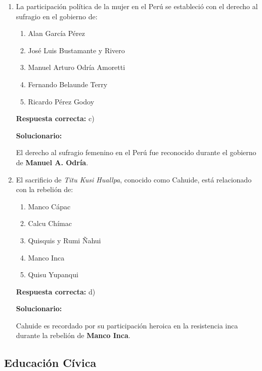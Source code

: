 \begin{enumerate}[resume]
	
	
	\item La participación política de la mujer en el Perú se estableció con el derecho al sufragio en el gobierno de:
	\begin{enumerate}[label=\alph*)]
		\item Alan García Pérez
		\item José Luis Bustamante y Rivero
		\item Manuel Arturo Odría Amoretti
		\item Fernando Belaunde Terry
		\item Ricardo Pérez Godoy
	\end{enumerate}
	\textbf{Respuesta correcta:} c)
	
	\vspace{2mm}
	\textbf{Solucionario:}
	
	El derecho al sufragio femenino en el Perú fue reconocido durante el gobierno de \textbf{Manuel A. Odría}.
	
	\vspace{6mm}
	
	\item El sacrificio de \textit{Titu Kusi Huallpa}, conocido como Cahuide, está relacionado con la rebelión de:
	\begin{enumerate}[label=\alph*)]
		\item Manco Cápac
		\item Calcu Chímac
		\item Quisquis y Rumi Ñahui
		\item Manco Inca
		\item Quisu Yupanqui
	\end{enumerate}
	\textbf{Respuesta correcta:} d)
	
	\vspace{2mm}
	\textbf{Solucionario:}
	
	Cahuide es recordado por su participación heroica en la resistencia inca durante la rebelión de \textbf{Manco Inca}.
	
	\vspace{6mm}
	
\end{enumerate}

\subsection*{Educación Cívica}

